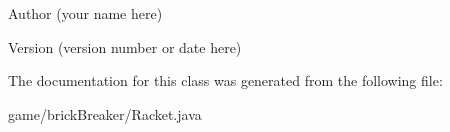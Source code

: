 \begin{DoxyAuthor}{Author}
(your name here) 
\end{DoxyAuthor}
\begin{DoxyVersion}{Version}
(version number or date here) 
\end{DoxyVersion}


The documentation for this class was generated from the following file:\begin{DoxyCompactItemize}
\item 
game/brickBreaker/Racket.java\end{DoxyCompactItemize}
